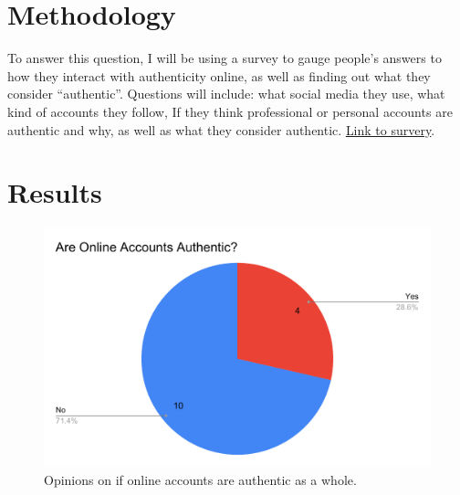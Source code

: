 \documentclass[12pt]{article}
\begin{document}
\begin{doublespace}
\section*{Methodology   }
    \par To answer this question, I will be using a survey to gauge people's answers to how they interact with authenticity online, as well as finding out what they consider ``authentic''.
        Questions will include: what social media they use, what kind of accounts they follow, If they think professional or personal accounts are authentic and why, as well as what they consider authentic.
        \underline{\href{https://forms.gle/sjiDcxBzhiiDFehy5}{Link to survery}}.

    \newpage
    \section*{Results}
    \begin{figure}[h]
        \includegraphics[width=.7\textwidth]{Are Online Accounts Authentic_.pdf}
        \centering
        \caption{Opinions on if online accounts are authentic as a whole.}
        \label{fig:pie1}
    \end{figure}


\end{doublespace}
\end{document}
